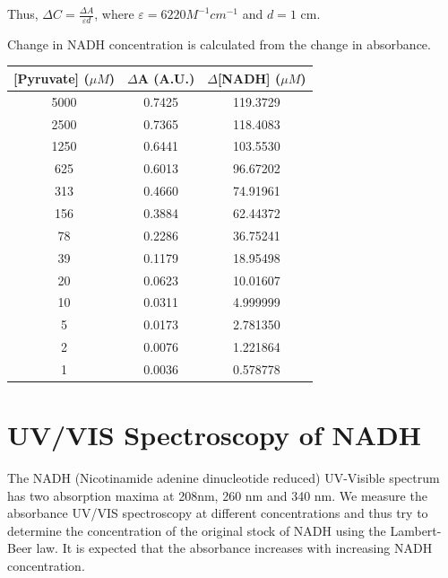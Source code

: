 \documentclass[a4paper,10pt]{article}
\begin{document}
                \begin{center}
                    Thus, $\Delta C = \frac{\Delta A}{\varepsilon d}$,
                    where $\varepsilon = 6220 M^{-1} cm^{-1}$ and $d = 1$ cm.
                \end{center}
                
                \noindent Change in NADH concentration is calculated from the change in absorbance.\\
                \begin{center}
                    \begin{tabular}{ c | c | c }
                        [Pyruvate] ($\mu M$) & $\Delta$A (A.U.) & $\Delta$[NADH] ($\mu M$) \\
                        \hline 
                        \hline 
                        5000 & 0.7425 & 119.3729 \\
                        2500 & 0.7365 & 118.4083 \\
                        1250 & 0.6441 & 103.5530 \\
                         625 & 0.6013 & 96.67202 \\
                         313 & 0.4660 & 74.91961 \\
                         156 & 0.3884 & 62.44372 \\
                          78 & 0.2286 & 36.75241 \\
                          39 & 0.1179 & 18.95498 \\
                          20 & 0.0623 & 10.01607 \\
                          10 & 0.0311 & 4.999999 \\
                           5 & 0.0173 & 2.781350 \\
                           2 & 0.0076 & 1.221864 \\
                           1 & 0.0036 & 0.578778 \\
                    \end{tabular}
                \end{center}

    \pagebreak

    \section{UV/VIS Spectroscopy of NADH}
    The NADH (Nicotinamide adenine dinucleotide reduced) UV-Visible spectrum has two absorption maxima at 
    208nm, 260 nm and 340 nm. We measure the absorbance UV/VIS spectroscopy at different concentrations and thus 
    try to determine the concentration of the original stock of NADH using the Lambert-Beer law.
    It is expected that the absorbance increases with increasing NADH concentration. 
    
\end{document}
